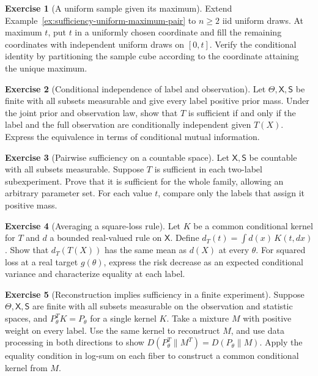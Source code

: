 \documentclass[11pt,oneside]{book}
\theoremstyle{definition}
\newtheorem{exercise}{Exercise}[section]
\theoremstyle{remark}
\begin{document}
\begin{exercise}[A uniform sample given its maximum]
\label{exer:sufficiency-uniform-maximum-general}
Extend Example~\ref{ex:sufficiency-uniform-maximum-pair} to
$n\geq2$ iid uniform draws. At maximum $t$, put $t$ in a
uniformly chosen coordinate and fill the remaining coordinates
with independent uniform draws on $[0,t]$. Verify the
conditional identity by partitioning the sample cube according
to the coordinate attaining the unique maximum.
\end{exercise}

\begin{exercise}[Conditional independence of label and observation]
\label{exer:sufficiency-conditional-independence}
Let $\Theta,\mathsf X,\mathsf S$ be finite with all subsets
measurable and give every label positive prior mass. Under the
joint prior and observation law, show that $T$ is sufficient if
and only if the label and the full observation are conditionally
independent given $T(X)$. Express the equivalence in terms of
conditional mutual information.
\end{exercise}

\begin{exercise}[Pairwise sufficiency on a countable space]
\label{exer:sufficiency-pairwise-countable}
Let $\mathsf X,\mathsf S$ be countable with all subsets
measurable. Suppose $T$ is sufficient in each two-label
subexperiment. Prove that it is sufficient for the whole
family, allowing an arbitrary parameter set. For each value
$t$, compare only the labels that assign it positive mass.
\end{exercise}

\begin{exercise}[Averaging a square-loss rule]
\label{exer:sufficiency-condition-square-loss}
Let $K$ be a common conditional kernel for $T$ and $d$ a bounded
real-valued rule on $\mathsf X$. Define
$d_T(t)=\int d(x)\,K(t,dx)$. Show that $d_T(T(X))$ has the same
mean as $d(X)$ at every $\theta$. For squared loss at a real
target $g(\theta)$, express the risk decrease as an expected
conditional variance and characterize equality at each label.
\end{exercise}

\begin{exercise}[Reconstruction implies sufficiency in a finite experiment]
\label{exer:sufficiency-reconstruction-finite-converse}
Suppose $\Theta,\mathsf X,\mathsf S$ are finite with all subsets
measurable on the observation and statistic spaces, and
$P_\theta^TK=P_\theta$ for a single kernel $K$. Take a mixture
$M$ with positive weight on every label. Use the same kernel
to reconstruct $M$, and use data processing in both directions
to show $D(P_\theta^T\|M^T)=D(P_\theta\|M)$. Apply the equality
condition in log-sum on each fiber to construct a common
conditional kernel from $M$.
\end{exercise}
\end{document}
